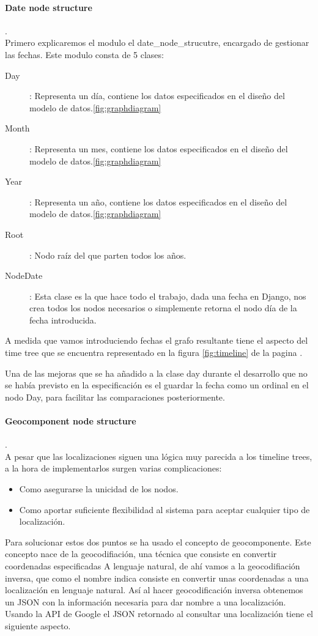 \paragraph{Date node structure}.\\
Primero explicaremos el modulo el date\_node\_strucutre, encargado de gestionar las fechas.
Este modulo consta de 5 clases:

\begin{description}
\item[Day]: Representa un día, contiene los datos especificados en el diseño del modelo de datos.\ref{fig:graphdiagram}
\item[Month]: Representa un mes, contiene los datos especificados en el diseño del modelo de datos.\ref{fig:graphdiagram}
\item[Year]: Representa un año, contiene los datos especificados en el diseño del modelo de datos.\ref{fig:graphdiagram}
\item[Root]: Nodo raíz del que parten todos los años.
\item[NodeDate]: Esta clase es la que hace todo el trabajo, dada una fecha en Django, nos crea todos los nodos necesarios o simplemente retorna el nodo día de la fecha introducida.
\end{description}
A medida que vamos introduciendo fechas el grafo resultante tiene el aspecto del time tree que se encuentra representado en la figura \ref{fig:timeline} de la pagina \pageref{fig:timeline}.

Una de las mejoras que se ha añadido a la clase day durante el desarrollo que no se había previsto en la especificación es el guardar la fecha como un ordinal en el nodo Day, para facilitar las comparaciones posteriormente.

\paragraph{Geocomponent node structure}.\\
A pesar que las localizaciones siguen una lógica muy parecida a los timeline trees, a la hora de implementarlos surgen varias complicaciones:
\begin{itemize}
\item Como asegurarse la unicidad de los nodos.
\item Como aportar suficiente flexibilidad al sistema para aceptar cualquier tipo de localización.
\end{itemize}

Para solucionar estos dos puntos se ha usado el concepto de geocomponente. Este concepto nace de la geocodifiación, una técnica que consiste en convertir coordenadas especificadas A lenguaje natural, de ahí vamos a la geocodifiación inversa, que como el nombre indica consiste en convertir unas coordenadas a una localización en lenguaje natural. Así al hacer geocodificación inversa obtenemos un JSON con la información necesaria para dar nombre a una localización. Usando la API de Google el JSON retornado al consultar una localización tiene el siguiente aspecto.

